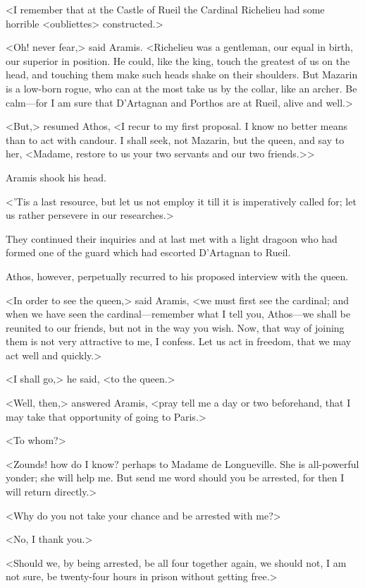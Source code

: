 <I remember that at the Castle of Rueil the Cardinal Richelieu had some horrible <oubliettes> constructed.>

<Oh! never fear,> said Aramis. <Richelieu was a gentleman, our equal in birth, our superior in position. He could, like the king, touch the greatest of us on the head, and touching them make such heads shake on their shoulders. But Mazarin is a low-born rogue, who can at the most take us by the collar, like an archer. Be calm—for I am sure that D'Artagnan and Porthos are at Rueil, alive and well.>

<But,> resumed Athos, <I recur to my first proposal. I know no better means than to act with candour. I shall seek, not Mazarin, but the queen, and say to her, <Madame, restore to us your two servants and our two friends.>>

Aramis shook his head.

<'Tis a last resource, but let us not employ it till it is imperatively called for; let us rather persevere in our researches.>

They continued their inquiries and at last met with a light dragoon who had formed one of the guard which had escorted D'Artagnan to Rueil.

Athos, however, perpetually recurred to his proposed interview with the queen.

<In order to see the queen,> said Aramis, <we must first see the cardinal; and when we have seen the cardinal—remember what I tell you, Athos—we shall be reunited to our friends, but not in the way you wish. Now, that way of joining them is not very attractive to me, I confess. Let us act in freedom, that we may act well and quickly.>

<I shall go,> he said, <to the queen.>

<Well, then,> answered Aramis, <pray tell me a day or two beforehand, that I may take that opportunity of going to Paris.>

<To whom?>

<Zounds! how do I know? perhaps to Madame de Longueville. She is all-powerful yonder; she will help me. But send me word should you be arrested, for then I will return directly.>

<Why do you not take your chance and be arrested with me?>

<No, I thank you.>

<Should we, by being arrested, be all four together again, we should not, I am not sure, be twenty-four hours in prison without getting free.>

